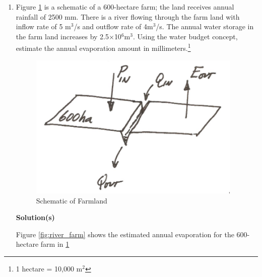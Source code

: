 \documentclass[12pt]{article}
\begin{document}
\begin{enumerate}
\item Figure \ref{fig:farmland} is a schematic of a 600-hectare farm; the land receives annual rainfall of 2500 mm.  There is a river flowing through the farm land with inflow rate of 5 m$^3$/s and outflow rate of 4m$^3$/s.  The annual water storage in the farm land increases by 2.5$\times$10$^6$m$^3$.  Using the water budget concept, estimate the annual evaporation amount in millimeters.\footnote{1 hectare = 10,000 m$^2$}

\begin{figure}[h!] %
   \centering
   \includegraphics[width=4in]{farmland.png} 
   \caption{Schematic of Farmland}
   \label{fig:farmland}
\end{figure}

\textbf{Solution(s)}

Figure \ref{fig:river_farm} shows the estimated annual evaporation for the 600-hectare farm in \ref{fig:farmland}


\end{enumerate}
\end{document}

